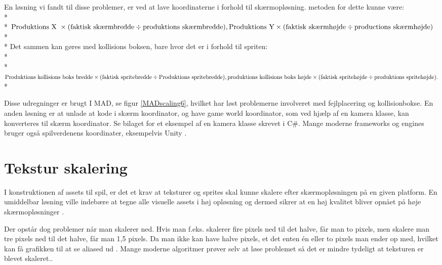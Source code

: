 \documentclass[Main.tex]{PositionOgSkalering}
\begin{document}
En løsning vi fandt til disse problemer, er ved at lave koordinaterne i forhold til skærmopløsning. metoden for dette kunne være: \\*\\*
\begin{math}
\text{Produktions X } \times (\text{faktisk skærmbredde} \div \text{produktions skærmbredde}), \\*
\text{Produktions Y} \times (\text{faktisk skærmhøjde} \div \text{productions skærmhøjde})\end{math} \\* \\*
Det sammen kan gøres med kollisions boksen, bare hvor det er i forhold til spriten:\\*\\*
\begin{math}\text{Produktions kollisions boks bredde} \times (\text{faktisk spritebredde} \div \text{Produktions spritebredde}),\\*
\text{produktions kollisions boks højde} \times (\text{faktisk spritehøjde} \div \text{produktions spritehøjde}).  \end{math}\\*

Disse udregninger er brugt I MAD, se figur \ref{MADscaling6}, hvilket har løst problemerne involveret med fejlplacering og kollisionbokse.
En anden løsning er at unlade at kode i skærm koordinator, og have game world koordinator, som ved hjælp af en kamera klasse, kan konverteres til skærm koordinator. Se bilaget for et eksempel af en kamera klasse skrevet i C\#.
Mange moderne frameworks og engines bruger også spilverdenens koordinater, eksempelvis Unity \cite{unity3d}.

\section{Tekstur skalering}
I konstruktionen af assets til spil, er det et krav at teksturer og sprites skal kunne skalere efter skærmopløsningen på en given platform. En umiddelbar løsning ville indebære at tegne alle visuelle assets i høj opløsning og dermed sikrer at en høj kvalitet bliver opnået på høje skærmopløsninger \cite{deepworldgame}.

Der opstår dog problemer når man skalerer ned. Hvis man f.eks. skalerer fire pixels ned til det halve, får man to pixels, men skalere man tre pixels ned til det halve, får man 1,5 pixels. Da man ikke kan have halve pixels, et det enten én eller to pixels man ender op med, hvilket kan få grafikken til at se aliased ud \cite{Martin}. Mange moderne algoritmer prøver selv at løse problemet så det er mindre tydeligt at teksturen er blevet skaleret.\cite{Kopf}.
\end{document}
